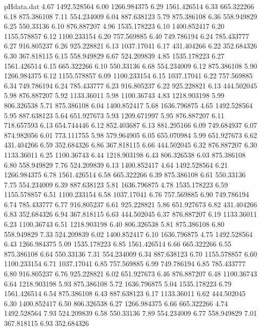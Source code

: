 \begin{filecontents}{pHdata.dat}
4.67 	1492.528564
6.00 	1266.984375
6.29 	1561.426514
6.33 	665.322266
6.18 	875.386108
7.11 	554.234009
6.04 	887.638123
5.79 	875.386108
6.36 	558.949829
6.25 	550.33136
6.10 	876.887207
4.96 	1535.178223
6.10 	1400.852417
6.20 	1155.578857
6.12 	1100.233154
6.20 	757.569885
6.40 	749.786194
6.24 	785.433777
6.27 	916.805237
6.26 	925.228821
6.13 	1037.17041
6.17 	431.404266
6.22 	352.684326
6.30 	367.818115
6.15 	558.949829
6.67 	524.209839
4.85 	1535.178223
6.27 	1561.426514
6.15 	665.322266
6.10 	550.33136
6.68 	554.234009
6.12 	875.386108
5.90 	1266.984375
6.12 	1155.578857
6.09 	1100.233154
6.15 	1037.17041
6.22 	757.569885
6.34 	749.786194
6.24 	785.433777
6.23 	916.805237
6.22 	925.228821
6.13 	444.502045
5.98 	876.887207
5.92 	1133.36011
5.98 	1100.36743
4.83 	1218.903198
5.99 	806.326538
5.71 	875.386108
6.04 	1400.852417
5.68 	1636.796875
4.65 	1492.528564
5.95 	887.638123
5.64 	651.927673
5.93 	1209.671997
5.95 	876.887207
6.11 	718.657593
6.13 	654.744446
6.12 	852.403687
6.13 	881.295166
6.09 	749.684937
6.07 	874.982056
6.01 	773.111755
5.98 	579.964905
6.05 	655.070984
5.99 	651.927673
6.62 	431.404266
6.59 	352.684326
6.86 	367.818115
6.66 	444.502045
6.32 	876.887207
6.30 	1133.36011
6.25 	1100.36743
6.44 	1218.903198
6.43 	806.326538
6.03 	875.386108
6.80 	558.949829
7.76 	524.209839
6.13 	1400.852417
4.64 	1492.528564
6.21 	1266.984375
6.78 	1561.426514
6.58 	665.322266
6.39 	875.386108
6.61 	550.33136
7.75 	554.234009
6.39 	887.638123
5.81 	1636.796875
4.78 	1535.178223
6.59 	1155.578857
6.51 	1100.233154
6.58 	1037.17041
6.76 	757.569885
6.90 	749.786194
6.74 	785.433777
6.77 	916.805237
6.61 	925.228821
5.86 	651.927673
6.82 	431.404266
6.83 	352.684326
6.94 	367.818115
6.63 	444.502045
6.37 	876.887207
6.19 	1133.36011
6.23 	1100.36743
6.51 	1218.903198
6.40 	806.326538
5.81 	875.386108
6.80 	558.949829
7.33 	524.209839
6.02 	1400.852417
6.10 	1636.796875
4.75 	1492.528564
6.43 	1266.984375
5.09 	1535.178223
6.85 	1561.426514
6.66 	665.322266
6.55 	875.386108
6.64 	550.33136
7.31 	554.234009
6.34 	887.638123
6.70 	1155.578857
6.60 	1100.233154
6.71 	1037.17041
6.85 	757.569885
6.99 	749.786194
6.85 	785.433777
6.80 	916.805237
6.76 	925.228821
6.02 	651.927673
6.46 	876.887207
6.48 	1100.36743
6.64 	1218.903198
5.93 	875.386108
5.72 	1636.796875
5.04 	1535.178223
6.79 	1561.426514
6.54 	875.386108
6.43 	887.638123
6.17 	1133.36011
6.62 	444.502045
6.30 	1400.852417
6.50 	806.326538
6.27 	1266.984375
6.66 	665.322266
4.74 	1492.528564
7.93 	524.209839
6.58 	550.33136
7.89 	554.234009
6.77 	558.949829
7.01 	367.818115
6.93 	352.684326

\end{filecontents}
